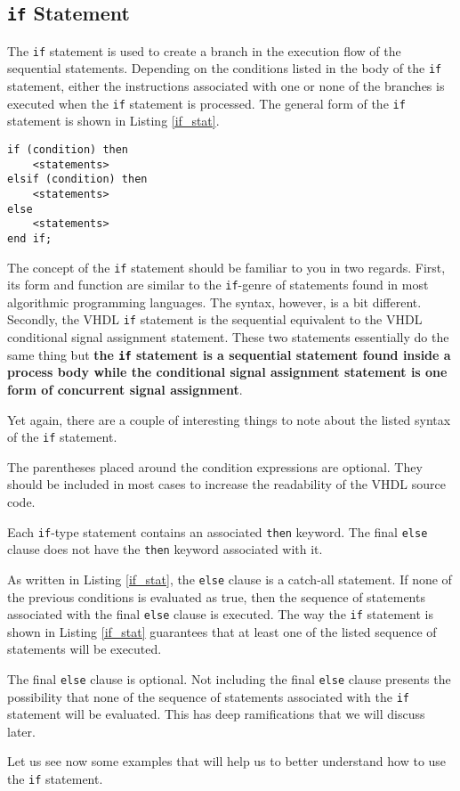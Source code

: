\subsection{\texttt{if} Statement}
The \texttt{if} statement is used to create a branch in the execution flow of the sequential statements. Depending on the conditions listed in the body of the \texttt{if} statement, either the instructions associated with one or none of the branches is executed when the \texttt{if} statement is processed. The general form of the \texttt{if} statement is shown in Listing \ref{if_stat}.

\noindent
\begin{minipage}{0.99\linewidth}
\begin{lstlisting}[label=if_stat, caption=Syntax of the \texttt{if} statement.]
if (condition) then
	<statements>
elsif (condition) then
	<statements>
else
	<statements>
end if;
\end{lstlisting}
\end{minipage}

The concept of the \texttt{if} statement should be familiar to you in two regards. First, its form and function are similar to the \texttt{if}-genre of statements found in most algorithmic programming languages. The syntax, however, is a bit different. Secondly, the VHDL \texttt{if} statement is the sequential equivalent to the VHDL conditional signal assignment statement. These two statements essentially do the same thing but \textbf{the \texttt{if} statement is a sequential statement found inside a process body while the conditional signal assignment statement is one form of concurrent signal assignment}.

Yet again, there are a couple of interesting things to note about the listed syntax of the \texttt{if} statement.
\begin{my_list}
\item The parentheses placed around the condition expressions are optional. They should be included in most cases to increase the readability of the VHDL source code.
\item Each \texttt{if}-type statement contains an associated \texttt{then} keyword. The final \texttt{else} clause does not have the \texttt{then} keyword associated with it.
\item As written in Listing \ref{if_stat}, the \texttt{else} clause is a catch-all statement. If none of the previous conditions is evaluated as true, then the sequence of statements associated with the final \texttt{else} clause is executed. The way the \texttt{if} statement is shown in Listing \ref{if_stat} guarantees that at least one of the listed sequence of statements will be executed.
\item The final \texttt{else} clause is optional. Not including the final \texttt{else} clause presents the possibility that none of the sequence of statements associated with the \texttt{if} statement will be evaluated. This has deep ramifications that we will discuss later.
\end{my_list}
Let us see now some examples that will help us to better understand how to use the \texttt{if} statement.


